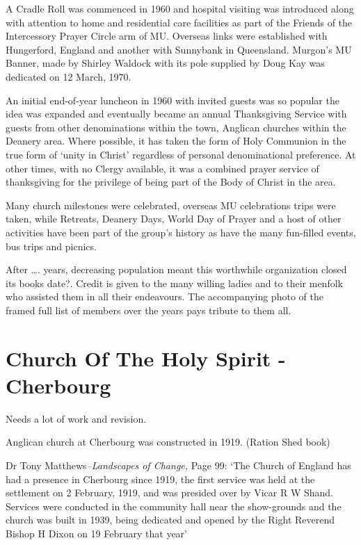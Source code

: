 A Cradle Roll was commenced in 1960 and hospital visiting was introduced along with attention to home and residential care facilities as part of the Friends of the Intercessory Prayer Circle arm of MU. Overseas links were established with Hungerford, England and another with Sunnybank in Queensland. Murgon's MU Banner, made by Shirley Waldock with its pole supplied by Doug Kay was dedicated on 12 March, 1970.

An initial end-of-year luncheon in 1960 with invited guests was so popular the idea was expanded and eventually became an annual Thanksgiving Service with guests from other denominations within the town, Anglican churches within the Deanery area. Where possible, it has taken the form of Holy Communion in the true form of `unity in Christ' regardless of personal denominational preference. At other times, with no Clergy available, it was a combined prayer service of thanksgiving for the privilege of being part of the Body of Christ in the area.

Many church milestones were celebrated, overseas MU celebrations trips were taken, while Retreats, Deanery Days, World Day of Prayer and a host of other activities have been part of the group's history as have the many fun-filled events, bus trips and picnics.

After \ldots. years, decreasing population meant this worthwhile organization closed its books date?. Credit is given to the many willing ladies and to their menfolk who assisted them in all their endeavours. The accompanying photo of the framed full list of members over the years pays tribute to them all.

\hypertarget{church-of-the-holy-spirit---cherbourg}{%
\section{Church Of The Holy Spirit - Cherbourg}\label{church-of-the-holy-spirit---cherbourg}}

Needs a lot of work and revision.

Anglican church at Cherbourg was constructed in 1919. (Ration Shed book)

Dr Tony Matthews\emph{--Landscapes of Change,} Page 99: `The Church of England has had a presence in Cherbourg since 1919, the first service was held at the settlement on 2 February, 1919, and was presided over by Vicar R W Shand. Services were conducted in the community hall near the show-grounds and the church was built in 1939, being dedicated and opened by the Right Reverend Bishop H Dixon on 19 February that year'

